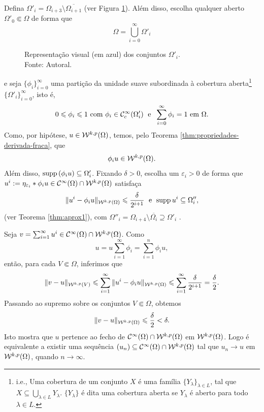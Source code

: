 \begin{prf}
    Defina $\Omega'_i = \Omega_{i+3} \setminus \overline{\Omega_{i+1}}$ (ver Figura \ref{fig:omegaii}).
    Além disso, escolha qualquer aberto $\Omega'_0 \Subset \Omega$ de forma que
    \[
        \Omega = \bigcup_{i=0}^\infty \Omega'_i
    \]
    \begin{figure}
        \centering
        
        \caption{Representação visual (em azul) dos conjuntos $\Omega'_i$.\\Fonte: Autoral.}
        \label{fig:omegaii}
    \end{figure}
    e seja $\{\phi_i\}_{i=0}^\infty$ uma partição da unidade suave subordinada à cobertura aberta\footnote{i.e., Uma cobertura de um conjunto $X$ é uma família $\{Y_\lambda\}_{\lambda\in L}$, tal que $X \subseteq \bigcup_{\lambda \in L} Y_\lambda$. $\{Y_\lambda\}$ é dita uma cobertura aberta se $Y_\lambda$ é aberto para todo $\lambda \in L$.} $\{\Omega'_i\}_{i=0}^\infty$, isto é,
    \[
       0 \leqslant \phi_i \leqslant 1 \text{ com } \phi_i \in \mathcal{C}^\infty_c(\Omega'_i) \;\text{ e }\; \sum_{i=0}^\infty \phi_i = 1 \text{ em } \Omega.
    \]
    Como, por hipótese, $u \in \mathcal{W}^{k,p}(\Omega)$, temos, pelo Teorema \ref{thm:propriedades-derivada-fraca}, que
    \[
        \phi_i u \in \mathcal{W}^{k,p}(\Omega).
    \]
    Além disso, $\mathrm{supp}\,(\phi_i u) \subseteq \Omega'_i$.
    Fixando $\delta > 0$, escolha um $\varepsilon_i > 0$ de forma que $u^i := \eta_{\varepsilon_i} * \phi_i u \in \mathcal{C}^{\infty}(\Omega) \cap \mathcal{W}^{k,p}(\Omega)$ satisfaça
    \[
        \Vert u^i - \phi_i u \Vert_{\mathcal{W}^{k,p}(\Omega)} \leqslant \frac{\delta}{2^{i+1}} \;\text{ e }\; \mathrm{supp}\, u^i \subseteq \Omega''_i,
    \]
    (ver Teorema \ref{thm:aprox1}),
    com $\Omega''_i = \Omega_{i+4} \setminus \overline{\Omega_{i}} \supseteq \Omega'_i$ .

    Seja $v = \sum_{i=1}^\infty u^i \in \mathcal{C}^{\infty}(\Omega) \cap \mathcal{W}^{k,p}(\Omega)$.
    Como 
    \[
        u = u \sum_{i=1}^\infty \phi_i = \sum_{i=1}^n \phi_i u,
    \]
    então, para cada $V \Subset \Omega$, inferimos que
    \[
        \Vert v - u \Vert_{\mathcal{W}^{k,p}(V)} \leqslant \sum_{i=1}^\infty \Vert u^i - \phi_i u \Vert_{\mathcal{W}^{k,p}(\Omega)} \leqslant \sum_{i=1}^\infty \frac{\delta}{2^{i+1}} = \frac{\delta}{2}.
    \]
    Passando ao supremo sobre os conjuntos $V \Subset \Omega$, obtemos
    \[
        \Vert v - u \Vert_{\mathcal{W}^{k,p}(\Omega)} \leqslant \frac{\delta}{2} < \delta.
    \]
    Isto mostra que $u$ pertence ao fecho de $\mathcal{C}^\infty(\Omega) \cap \mathcal{W}^{k,p}(\Omega)$ em $\mathcal{W}^{k,p}(\Omega)$. Logo é equivalente a existir uma sequência $(u_n) \subseteq \mathcal{C}^\infty(\Omega) \cap \mathcal{W}^{k,p}(\Omega)$ tal que $u_n \to u$ em $\mathcal{W}^{k,p}(\Omega)$, quando $n \to \infty$.
\end{prf}

